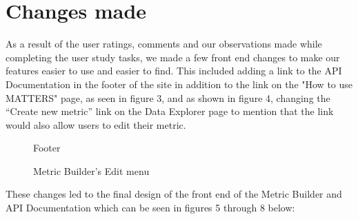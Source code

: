 	\section{Changes made}

		As a result of the user ratings, comments and our observations made while completing 
		the user study tasks, we made a few front end changes to make our features easier 
		to use and easier to find. This included adding a link to the API Documentation in 
		the footer of the site in addition to the link on the "How to use MATTERS" page, as seen 
		in figure 3, and as shown in figure 4, changing the “Create new metric” link on the 
		Data Explorer page to mention that the link would also allow users to edit their metric. 
		
			\begin{figure}[t]
				\centering
					\caption{Footer}
			\end{figure}
			
			\begin{figure}[t]
				\centering
					\caption{Metric Builder's Edit menu}
			\end{figure}
			
		These changes led to the final design of the front end of the Metric Builder 
		and API Documentation which can be seen in figures 5 through 8 below:

